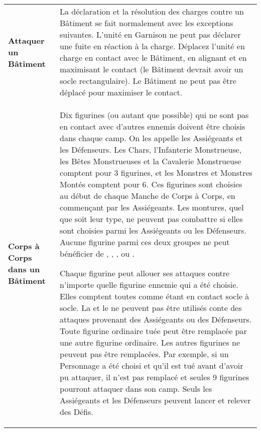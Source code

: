 \noindent\begin{tabular}{>{\bfseries\raggedleft}p{2.2cm}p{13.5cm}}
Attaquer un Bâtiment & La déclaration et la résolution des charges contre un Bâtiment se fait normalement avec les exceptions suivantes. L'unité en Garnison ne peut pas déclarer une fuite en réaction à la charge. Déplacez l'unité en charge en contact avec le Bâtiment, en alignant et en maximisant le contact (le Bâtiment devrait avoir un socle rectangulaire). Le Bâtiment ne peut pas être déplacé pour maximiser le contact. \tabularnewline
Corps à Corps dans un Bâtiment & Dix figurines (ou autant que possible) qui ne sont pas en contact avec d'autres ennemis doivent être choisis dans chaque camp. On les appelle les Assiégeants et les Défenseurs. Les Chars, l'Infanterie Monstrueuse, les Bêtes Monstrueuses et la Cavalerie Monstrueuse comptent pour 3 figurines, et les Monstres et Monstres Montés comptent pour 6. Ces figurines sont choisies au début de chaque Manche de Corps à Corps, en commençant par les Assiégeants. Les montures, quel que soit leur type, ne peuvent pas combattre si elles sont choisies parmi les Assiégeants ou les Défenseurs. Aucune figurine parmi ces deux groupes ne peut bénéficier de \impacthits{}, \lance{}, \lightlance{}, \mountsprotection{} ou \barding{}. 

Chaque figurine peut allouer ses attaques contre n'importe quelle figurine ennemie qui a été choisie. Elles comptent toutes comme étant en contact socle à socle. La \mountsprotection{} et le \barding{} ne peuvent pas être utilisés conte des attaques provenant des Assiégeants ou des Défenseurs. Toute figurine ordinaire tuée peut être remplacée par une autre figurine ordinaire. Les autres figurines ne peuvent pas être remplacées. Par exemple, si un Personnage a été choisi et qu'il est tué avant d'avoir pu attaquer, il n'est pas remplacé et seules 9 figurines pourront attaquer dans son camp. Seuls les Assiégeants et les Défenseurs peuvent lancer et relever des Défis.


\end{tabular}
